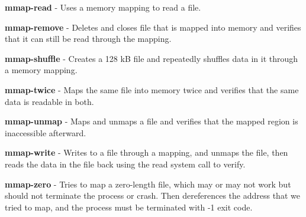 \textbf{mmap-read} - Uses a memory mapping to read a file.


\textbf{mmap-remove} - Deletes and closes file that is mapped into memory and verifies that it can still be read through the mapping.


\textbf{mmap-shuffle} - Creates a 128 kB file and repeatedly shuffles data in it through a memory mapping.


\textbf{mmap-twice} - Maps the same file into memory twice and verifies that the same data is readable in both.


\textbf{mmap-unmap} - Maps and unmaps a file and verifies that the mapped region is inaccessible afterward.


\textbf{mmap-write} - Writes to a file through a mapping, and unmaps the file, then reads the data in the file back using the read system call to verify.


\textbf{mmap-zero} - Tries to map a zero-length file, which may or may not work but  should not terminate the process or crash.  Then dereferences the address that we tried to map, and the process must be terminated with -1 exit code. 









	

